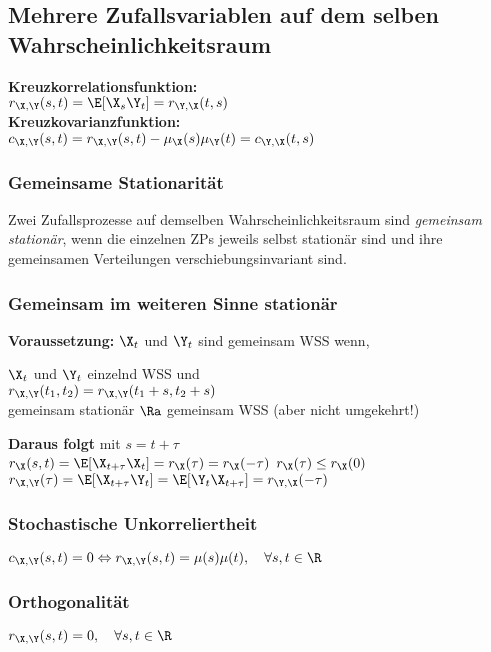 \documentclass[german,color,6pt]{latex4ei/latex4ei_sheet}
\begin{document}
\begin{sectionbox}
	\subsection{Mehrere Zufallsvariablen auf dem selben Wahrscheinlichkeitsraum}
	\begin{emphbox}
		\raggedright
		\textbf{Kreuzkorrelationsfunktion:} \\ $r_{\X,\Y}(s,t) = \E[\X_s \Y_t] = r_{\Y,\X}(t,s)$\\
		\textbf{Kreuzkovarianzfunktion:}\\ $c_{\X,\Y}(s,t) = r_{\X,\Y}(s,t) - \mu_{\X}(s)\mu_{\Y}(t) = c_{\Y,\X}(t,s)$
	\end{emphbox}
	
	\subsubsection{Gemeinsame Stationarität}
	Zwei Zufallsprozesse auf demselben Wahrscheinlichkeitsraum sind \emph{gemeinsam stationär}, wenn die einzelnen ZPs jeweils selbst stationär sind und ihre gemeinsamen Verteilungen verschiebungsinvariant sind.
	
	\subsubsection{Gemeinsam im weiteren Sinne stationär}
	\textbf{Voraussetzung:} $\X_t$ und $\Y_t$ sind gemeinsam WSS wenn,\\
	
	\begin{emphbox}
		\raggedright
		$\X_t$ und $\Y_t$ einzelnd WSS und\\
		$r_{\X,\Y}(t_1,t_2) = r_{\X,\Y}(t_1 + s,t_2 + s)$\\
		gemeinsam stationär $\Ra$ gemeinsam WSS (aber nicht umgekehrt!)
	\end{emphbox}
	\textbf{Daraus folgt} mit $s = t + \tau$\\
	$r_{\X}(s,t) = \E[\X_{t+\tau} \X_t] = r_{\X}(\tau) = r_{\X}(-\tau)$ \qquad $r_{\X}(\tau) \le r_{\X}(0)$\\
	$r_{\X,\Y}(\tau)=\E[\X_{t+\tau} \Y_t]=\E[\Y_t \X_{t+\tau}]=r_{\Y,\X}(-\tau)$
	\subsubsection{Stochastische Unkorreliertheit}
	$c_{\X,\Y}(s,t) = 0 \Leftrightarrow r_{\X,\Y}(s,t) = \mu(s)\mu(t), \quad \forall s,t \in \R$
	\subsubsection{Orthogonalität}
	$r_{\X,\Y}(s,t) = 0, \quad \forall s,t \in \R$
\end{sectionbox}
\end{document}
